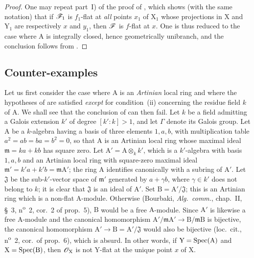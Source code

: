 \begin{proof}
One may repeat part~I) of the proof of , which shows (with the same notation) that if $\mathscr{F}_1$ is $f_1$-flat at \emph{all} points $x_1$ of $\mathrm{X}_1$ whose projections in $\mathrm{X}$ and $\mathrm{Y}_1$ are respectively $x$ and $y_1$, then $\mathscr{F}$ is $f$-flat at $x$.
One is thus reduced to the case where $\mathrm{A}$ is integrally closed, hence geometrically unibranch, and the conclusion follows from .
\end{proof}

\subsection{Counter-examples}
\label{subsection:IV.11.7}

\begin{env}[11.7.1]
\label{IV.11.7.1}
Let us first consider the case where $\mathrm{A}$ is an \emph{Artinian} local ring and where the hypotheses of  are satisfied \emph{except} for condition~(ii) concerning the residue field $k$ of $\mathrm{A}$. We shall see that the conclusion of  can then fail.
Let $k$ be a field admitting a Galois extension $k'$ of degree $[k':k]>1$, and let $\Gamma$ denote its Galois group.
Let $\mathrm{A}$ be a $k$-algebra having a basis of three elements $1,a,b$, with multiplication table $a^2=ab=ba=b^2=0$, so that $\mathrm{A}$ is an Artinian local ring whose maximal ideal $\mathfrak{m}=ka+kb$ has square zero.
Let $\mathrm{A}'=\mathrm{A}\otimes_k k'$, which is a $k'$-algebra with basis $1,a,b$ and an Artinian local ring with square-zero maximal ideal $\mathfrak{m}'=k'a+k'b=\mathfrak{m}\mathrm{A}'$; the ring $\mathrm{A}$ identifies canonically with a subring of $\mathrm{A}'$.
Let $\mathfrak{J}$ be the sub-$k'$-vector space of $\mathfrak{m}'$ generated by $a+\gamma b$, where $\gamma\in k'$ does not belong to $k$; it is clear that $\mathfrak{J}$ is an ideal of $\mathrm{A}'$.
Set $\mathrm{B}=\mathrm{A}'/\mathfrak{J}$; this is an Artinian ring which is a non-flat $\mathrm{A}$-module. Otherwise (Bourbaki, \emph{Alg.\ comm.}, chap.~II, \S~3, n\textsuperscript{o}~2, cor.~2 of prop.~5), $\mathrm{B}$ would be a free $\mathrm{A}$-module. Since $\mathrm{A}'$ is likewise a free $\mathrm{A}$-module and the canonical homomorphism $\mathrm{A}'/\mathfrak{m}\mathrm{A}'\to\mathrm{B}/\mathfrak{m}\mathrm{B}$ is bijective, the canonical homomorphism $\mathrm{A}'\to\mathrm{B}=\mathrm{A}'/\mathfrak{J}$ would also
be bijective (loc.~cit., n\textsuperscript{o}~2, cor.~of prop.~6), which is absurd. In other words, if $\mathrm{Y}=\operatorname{Spec}(\mathrm{A})$ and $\mathrm{X}=\operatorname{Spec}(\mathrm{B})$, then $\mathscr{O}_\mathrm{X}$ is not $\mathrm{Y}$-flat at the unique point $x$ of $\mathrm{X}$.

\end{env}
